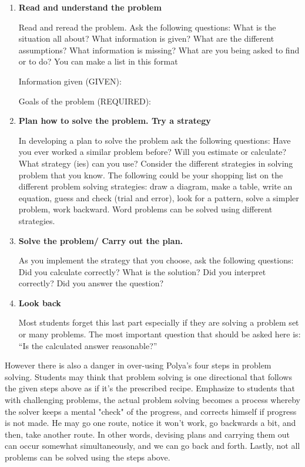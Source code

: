 \begin{enumerate}
\item \textbf{Read and understand the problem}

Read and reread the problem. Ask the following questions: What is the situation all
about? What information is given? What are the different assumptions? What information is
missing? What are you being asked to find or to do? You can make a list in this format

Information given (GIVEN): \makebox[2in]{\hrulefill}

Goals of the problem (REQUIRED): \makebox[2in]{\hrulefill}

\item \textbf{Plan how to solve the problem. Try a strategy}

In developing a plan to solve the problem ask the following questions: Have you ever
worked a similar problem before? Will you estimate or calculate? What strategy (ies) can you
use? Consider the different strategies in solving problem that you know. The following could be
your shopping list on the different problem solving strategies: draw a diagram, make a table,
write an equation, guess and check (trial and error), look for a pattern, solve a simpler problem,
work backward. Word problems can be solved using different strategies.

\item \textbf{Solve the problem/ Carry out the plan.}

As you implement the strategy that you choose, ask the following questions: Did you
calculate correctly? What is the solution? Did you interpret correctly? Did you answer the
question?

\item \textbf{Look back}

Most students forget this last part especially if they are solving a problem set or many
problems. The most important question that should be asked here is: “Is the calculated answer
reasonable?”
\end{enumerate}
However there is also a danger in over-using Polya's four steps in problem solving. Students
may think that problem solving is one directional that follows the given steps above as if it's the
prescribed recipe. Emphasize to students that with challenging problems, the actual problem solving
becomes a process whereby the solver keeps a mental "check" of the progress, and corrects himself if
progress is not made. He may go one route, notice it won't work, go backwards a bit, and then, take
another route. In other words, devising plans and carrying them out can occur somewhat
simultaneously, and we can go back and forth. Lastly, not all problems can be solved using the steps
above.


